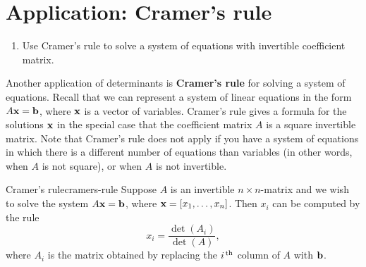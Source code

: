 \section{Application: Cramer's rule}

\begin{outcome}
  \begin{enumerate}
  \item Use Cramer's rule to solve a system of equations with
    invertible coefficient matrix.
  \end{enumerate}
\end{outcome}

Another application of determinants is \textbf{Cramer's rule} for
solving a system of equations. Recall that we can represent a system
of linear equations in the form $A\mbox{\bf x}=\mbox{\bf b}$, where $\mbox{\bf x}$
is a vector of variables. Cramer's rule gives a formula for the
solutions $\mbox{\bf x}$ in the special case that the coefficient matrix
$A$ is a square invertible matrix. Note that Cramer's rule does not
apply if you have a system of equations in which there is a different
number of equations than variables (in other words, when $A$ is not
square), or when $A$ is not invertible.

\begin{theorem}{Cramer's rule}{cramers-rule}
  Suppose $A$ is an invertible $n\times n$-matrix and we wish to solve
  the system $A\mbox{\bf x}=\mbox{\bf b}$, where
  $\mbox{\bf x}=\left[x_1,\ldots,x_n\right]$.  Then $x_i$ can be computed by the
  rule%
  \begin{equation*}
    x_{i} = \frac{\det(A_{i})}{\det(A)},
  \end{equation*}
  where $A_{i}$ is the matrix obtained by replacing the $i^{\,\rm th}$ column
  of $A$ with $\mbox{\bf b}$.
\end{theorem}

